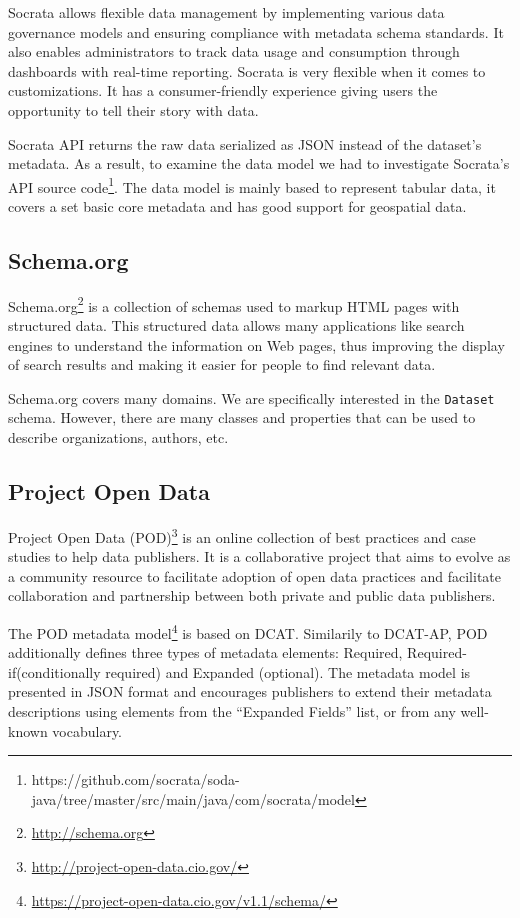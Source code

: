 \documentclass[runningheads,a4paper]{llncs}
\begin{document}
Socrata allows flexible data management by implementing various data governance models and ensuring compliance with metadata schema standards. It also enables administrators to track data usage and consumption through dashboards with real-time reporting. Socrata is very flexible when it comes to customizations. It has a consumer-friendly experience giving users the opportunity to tell their story with data.

Socrata API returns the raw data serialized as JSON instead of the dataset's metadata. As a result, to examine the data model we had to investigate Socrata's API source code\footnote{https://github.com/socrata/soda-java/tree/master/src/main/java/com/socrata/model}. The data model is mainly based to represent tabular data, it covers a set basic core metadata and has good support for geospatial data.

\subsection{Schema.org}

Schema.org\footnote{\url{http://schema.org}} is a collection of schemas used to markup HTML pages with structured data. This structured data allows many applications like search engines to understand the information on Web pages, thus improving the display of search results and making it easier for people to find relevant data.

Schema.org covers many domains. We are specifically interested in the \texttt{Dataset} schema. However, there are many classes and properties that can be used to describe organizations, authors, etc.

\subsection{Project Open Data}

Project Open Data (POD)\footnote{\url{http://project-open-data.cio.gov/}} is an online collection of best practices and case studies to help data publishers. It is a collaborative project that aims to evolve as a community resource to facilitate adoption of open data practices and facilitate collaboration and partnership between both private and public data publishers.

The POD metadata model\footnote{\url{https://project-open-data.cio.gov/v1.1/schema/}} is based on DCAT. Similarily to DCAT-AP, POD additionally defines three types of metadata elements: Required, Required-if(conditionally required) and Expanded (optional). The metadata model is presented in JSON format and encourages publishers to extend their metadata descriptions using elements from the ``Expanded Fields'' list, or from any well-known vocabulary.
\end{document}
